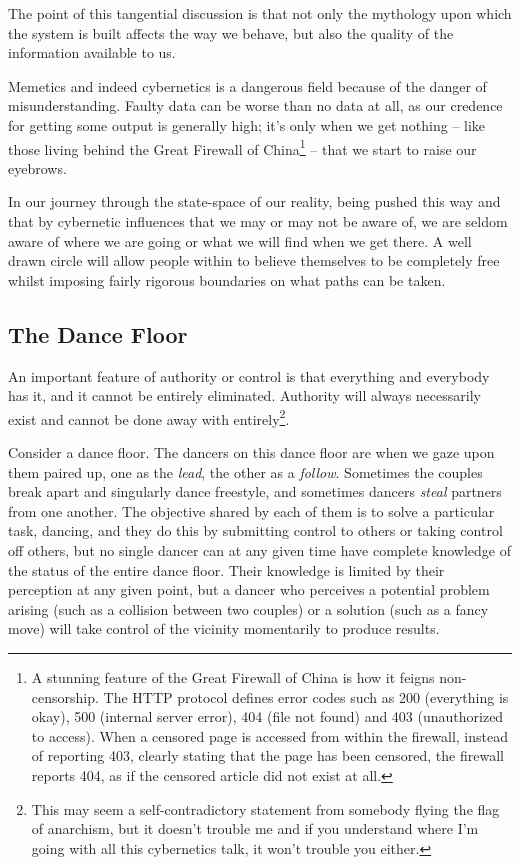 The point of this tangential discussion is that not only the mythology upon
which the system is built af\hbox{}fects the way we behave, but also the 
quality of the information available to us.

Memetics and indeed cybernetics is a dangerous f\hbox{}ield because of the
danger of misunderstanding. Faulty data can be worse than no data at all, as 
our credence for getting some output is generally high; it's only when we get
nothing – like those living behind the Great F\hbox{}irewall of 
China\footnote{A stunning feature of the Great F\hbox{}irewall of China is how
it feigns non-censorship. The HTTP protocol def\hbox{}ines error codes such as
200 (everything is okay), 500 (internal server error), 404 (f\hbox{}ile not
found) and 403 (unauthorized to access). When a censored page is accessed from
within the f\hbox{}irewall, instead of reporting 403, clearly stating that the
page has been censored, the f\hbox{}irewall reports 404, as if the censored
article did not exist at all.} – that we start to raise our eyebrows.

In our journey through the state-space of our reality, being pushed this way 
and that by cybernetic inf\hbox{}luences that we may or may not be aware of, we
are seldom aware of where we are going or what we will f\hbox{}ind when we get
there. A well drawn circle will allow people within to believe themselves to be
completely free whilst imposing fairly rigorous boundaries on what paths can be
taken.


\subsection{The Dance F\hbox{}loor}
\label{s:artificial_scarcity:burning_bridges:dance_floor}

An important feature of authority or control is that everything and everybody
has it, and it cannot be entirely eliminated. Authority will always necessarily
exist and cannot be done away with entirely\footnote{This may seem a
self-contradictory statement from somebody f\hbox{}lying the f\hbox{}lag of
anarchism, but it doesn't trouble me and if you understand where I'm going with
all this cybernetics talk, it won't trouble you either.}.

Consider a dance f\hbox{}loor. The dancers on this dance f\hbox{}loor are when
we gaze upon them paired up, one as the \textit{lead}, the other as a
\textit{follow}. Sometimes the couples break apart and singularly dance
freestyle, and sometimes dancers \textit{steal} partners from one another. The
objective shared by each of them is to solve a particular task, dancing, and
they do this by submitting control to others or taking control of\hbox{}f
others, but no single dancer can at any given time have complete knowledge of
the status of the entire dance f\hbox{}loor. Their knowledge is limited by 
their perception at any given point, but a dancer who perceives a potential
problem arising (such as a collision between two couples) or a solution (such 
as a fancy move) will take control of the vicinity momentarily to produce
results.


